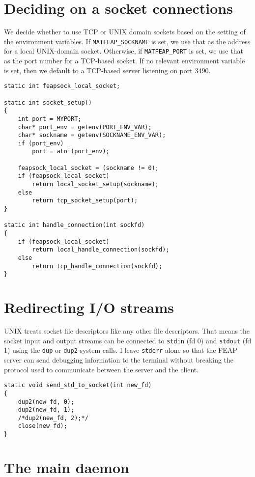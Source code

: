 \section{Deciding on a socket connections}

We decide whether to use TCP or UNIX domain sockets based on
the setting of the environment variables.  If
{\tt MATFEAP\_SOCKNAME} is set, we use that as the address for
a local UNIX-domain socket.  Otherwise, if {\tt MATFEAP\_PORT} is
set, we use that as the port number for a TCP-based socket.
If no relevant environment variable is set, then we default to
a TCP-based server listening on port 3490.

\begin{verbatim}
static int feapsock_local_socket;

static int socket_setup()
{
    int port = MYPORT;
    char* port_env = getenv(PORT_ENV_VAR);
    char* sockname = getenv(SOCKNAME_ENV_VAR);
    if (port_env)
        port = atoi(port_env);

    feapsock_local_socket = (sockname != 0);
    if (feapsock_local_socket)
        return local_socket_setup(sockname);
    else
        return tcp_socket_setup(port);
}

static int handle_connection(int sockfd)
{
    if (feapsock_local_socket)
        return local_handle_connection(sockfd);
    else
        return tcp_handle_connection(sockfd);
}

\end{verbatim}
\section{Redirecting I/O streams}

UNIX treats socket file descriptors like any other file
descriptors.  That means the socket input and output streams can be
connected to {\tt stdin} (fd 0) and {\tt stdout} (fd 1) using the
{\tt dup} or {\tt dup2} system calls.  I leave {\tt stderr} alone
so that the FEAP server can send debugging information to the terminal
without breaking the protocol used to communicate between the server and
the client.

\begin{verbatim}
static void send_std_to_socket(int new_fd)
{
    dup2(new_fd, 0);
    dup2(new_fd, 1);
    /*dup2(new_fd, 2);*/
    close(new_fd);
}

\end{verbatim}
\section{The main daemon}

